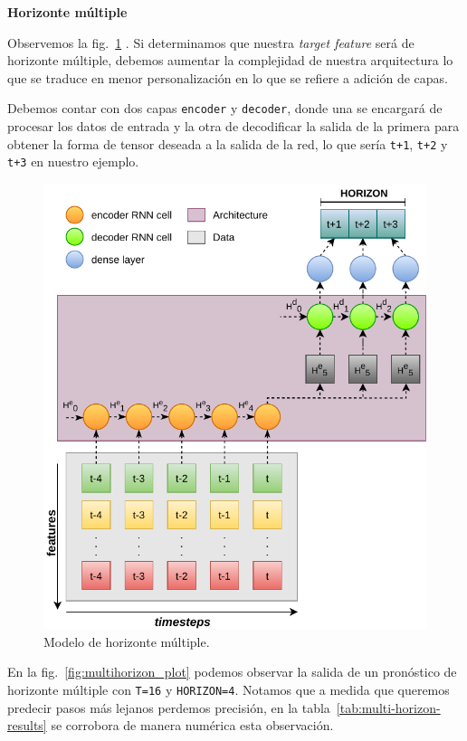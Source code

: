 \documentclass[a4paper,12pt]{article}
\begin{document}
\textbf{Horizonte múltiple}

Observemos la fig.~\ref{fig:multihorizon_model} \citep{rnn_ed_azure}. Si determinamos que nuestra \textit{target feature} será de horizonte múltiple, debemos aumentar la complejidad de nuestra arquitectura lo que se traduce en menor personalización en lo que se refiere a adición de capas.

Debemos contar con dos capas \texttt{encoder} y \texttt{decoder}, donde una se encargará de procesar los datos de entrada y la otra de decodificar la salida de la primera para obtener la forma de tensor deseada a la salida de la red, lo que sería \texttt{t+1}, \texttt{t+2} y \texttt{t+3} en nuestro ejemplo.

\begin{figure}[H]
	\begin{center}
	\includegraphics[width=1\textwidth]{multihorizon-model.pdf}
  	\caption{Modelo de horizonte múltiple.}
  	\label{fig:multihorizon_model}
  	\end{center}
\end{figure}

En la fig.~\ref{fig:multihorizon_plot} podemos observar la salida de un pronóstico de horizonte múltiple con \texttt{T=16} y \texttt{HORIZON=4}. Notamos que a medida que queremos predecir pasos más lejanos perdemos precisión, en la tabla~\ref{tab:multi-horizon-results} se corrobora de manera numérica esta observación.
\end{document}
